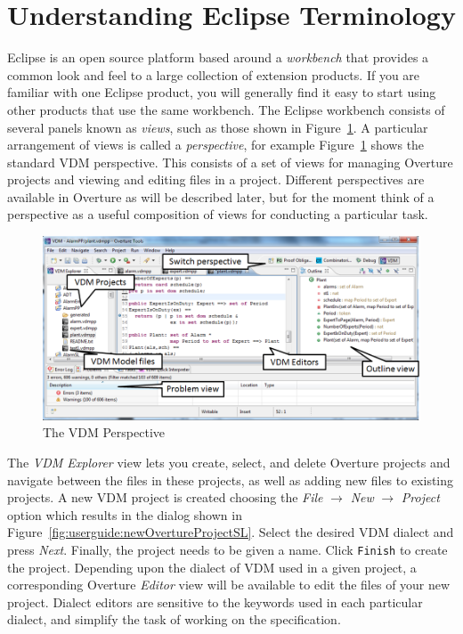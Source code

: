 \documentclass{overturerepchap}
\begin{document}
\section{Understanding Eclipse Terminology}

Eclipse is an open source platform based around a
\emph{workbench} that provides a common look and feel
to a large collection of extension products. If you are
familiar with one Eclipse product, you will generally find it easy to start
using other products that use the same workbench. The Eclipse workbench
consists of several panels known as \emph{views}, such as
those shown in Figure~\ref{fig:userguire:OverturePerspective}.
A particular arrangement of views
is called a \emph{perspective}, for example
Figure~\ref{fig:userguire:OverturePerspective} shows the standard
VDM perspective. This consists of a set of views for managing
Overture projects and viewing and editing files in a
project. Different perspectives are available in Overture as will be
described later, but for the moment think of a perspective as a
useful composition of views for conducting a particular task.

\begin{figure}[!h]
\begin{center}
  \includegraphics[width=\textwidth]{figures/OverturePerspective}
  \caption[labelInTOC]{The VDM Perspective}
  \label{fig:userguire:OverturePerspective}
\end{center}
\end{figure}

The \emph{VDM Explorer} view lets you create, select,
and delete Overture projects and navigate between the files in these
projects, as well as adding new files to existing projects. A new VDM
project is created choosing the \emph{File} $ \rightarrow$ \emph{New}
$\rightarrow$ \emph{Project} option which results in the dialog shown in
Figure~\ref{fig:userguide:newOvertureProjectSL}. Select
the desired VDM dialect and press \emph{Next}. Finally, the project
needs to be given a name. Click \texttt{Finish} to create the project.
Depending upon the dialect of VDM used in a given project,
a corresponding Overture \emph{Editor} view will be available to edit the files of
your new project. Dialect editors are sensitive to the keywords used in
each particular dialect, and simplify the task of working on the
specification.
\end{document}

